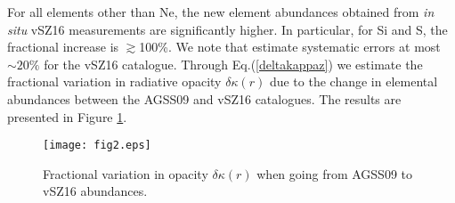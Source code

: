 \documentclass[aps,prl,twocolumn,showpacs]{revtex4}
\begin{document}
For all elements other than Ne, the new element abundances obtained from \textit{in situ} vSZ16 measurements are significantly higher. In particular, for Si and S, the fractional increase is $\gtrsim$100\%. We note that \cite{shearer} estimate systematic errors at most $\sim 20\%$ for the vSZ16 catalogue. Through Eq.(\ref{deltakappaz}) we estimate the fractional variation in radiative opacity $\delta \kappa (r)$ due to the change in elemental abundances between the AGSS09 and vSZ16 catalogues. The results are presented in Figure \ref{fig2}.%
\begin{figure}[!h]
\texttt{[image: fig2.eps]}
\caption{Fractional variation in opacity $\delta \kappa (r)$ when going from AGSS09 to vSZ16 abundances.}
\label{fig2}
\end{figure}
\end{document}
